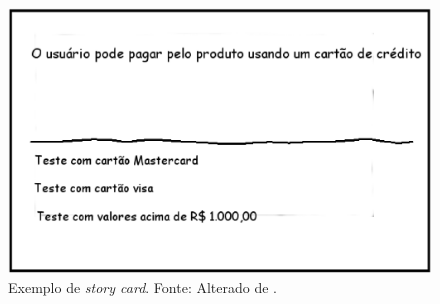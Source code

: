 \begin{figure}[ht]
	\centering
	\includegraphics[width=15 cm]{figuras/story_card.eps}
	\caption{Exemplo de \emph{story card}. Fonte: Alterado de .}
    	\label{story_card}
\end{figure}


